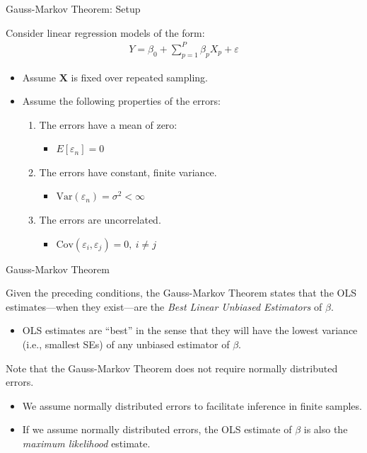 \documentclass{beamer}\usepackage[]{graphicx}\usepackage[]{color}
\begin{document}
\begin{frame}{Gauss-Markov Theorem: Setup}
  
  Consider linear regression models of the form:
  \begin{align*}
    Y = \beta_0 + \sum_{p = 1}^P \beta_p X_p + \varepsilon
  \end{align*}
  \begin{itemize}
  \item Assume $\mathbf{X}$ is fixed over repeated sampling.
    \vb
  \item Assume the following properties of the errors:
    \vb
    \begin{enumerate}
    \item The errors have a mean of zero:
      \begin{itemize}
      \item $E[\varepsilon_n] = 0$
      \end{itemize}
      \vb
    \item The errors have constant, finite variance.
      \vc
      \begin{itemize}
      \item $\text{Var}(\varepsilon_n) = \sigma^2 < \infty$
      \end{itemize}
      \vb
    \item The errors are uncorrelated.
      \vc
      \begin{itemize}
      \item $\text{Cov}(\varepsilon_i, \varepsilon_j) = 0, ~ i \neq j$
      \end{itemize}
    \end{enumerate}
  \end{itemize}
  
\end{frame}


\begin{frame}{Gauss-Markov Theorem}
  
  Given the preceding conditions, the Gauss-Markov Theorem states that the OLS 
  estimates---when they exist---are the \emph{Best Linear Unbiased Estimators} 
  of $\beta$.
  \vc
  \begin{itemize}
  \item OLS estimates are ``best'' in the sense that they will have the lowest 
    variance (i.e., smallest SEs) of any unbiased estimator of $\beta$.
  \end{itemize}
  \vb
  \pause
  Note that the Gauss-Markov Theorem does not require normally distributed 
  errors.
  \vc
  \begin{itemize} 
  \item We assume normally distributed errors to facilitate inference in finite 
    samples.
    \vc
  \item If we assume normally distributed errors, the OLS estimate of $\beta$ is 
    also the \emph{maximum likelihood} estimate.
  \end{itemize}
  
\end{frame}
\end{document}
